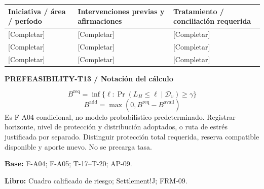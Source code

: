 {\sffamily\fontsize{8.3}{10.3}\selectfont\begin{longtable}{@{}P{51.14mm} P{56.09mm} P{57.74mm}@{}}
\toprule
\textbf{Iniciativa / área / período} & \textbf{Intervenciones previas y afirmaciones} & \textbf{Tratamiento / conciliación requerida}\\\midrule\endhead
\rule{0pt}{7.7mm}[Completar] & [Completar] & [Completar]\\\hline
\rule{0pt}{7.7mm}[Completar] & [Completar] & [Completar]\\\hline
\rule{0pt}{7.7mm}[Completar] & [Completar] & [Completar]\\\hline
\end{longtable}}
\par\begingroup\sffamily\fontsize{8}{10}\selectfont\color{NEBGreen}\setlength{\parskip}{2pt}\setlength{\abovedisplayskip}{4pt}\setlength{\belowdisplayskip}{4pt}\setlength{\abovedisplayshortskip}{2pt}\setlength{\belowdisplayshortskip}{3pt}
\textbf{PREFEASIBILITY-T13 / Notación del cálculo}\par
{\fontsize{9}{11}\selectfont\[ B^{\mathrm{req}}=\inf\{\ell:\Pr(L_H\le\ell\mid\mathcal D_v)\ge\gamma\} \]}
{\fontsize{9}{11}\selectfont\[ B^{\mathrm{add}}=\max(0,B^{\mathrm{req}}-B^{\mathrm{avail}}) \]}
Es F-A04 condicional, no modelo probabilístico predeterminado. Registrar horizonte, nivel de protección y distribución adoptados, o ruta de estrés justificada por separado. Distinguir protección total requerida, reserva compatible disponible y aporte nuevo. No se precarga tasa.\par
\textbf{Base:} F-A04; F-A05; T-17–T-20; AP-09.\par
\textbf{Libro:} Cuadro calificado de riesgo; Settlement!J; FRM-09.\par\endgroup
